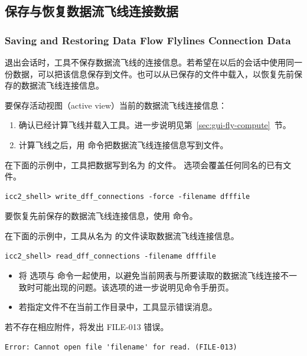 \subsection{保存与恢复数据流飞线连接数据}
\subsubsection*{Saving and Restoring Data Flow Flylines Connection Data}

退出会话时，工具不保存数据流飞线的连接信息。若希望在以后的会话中使用同一份数据，可以把该信息保存到文件。也可以从已保存的文件中载入，以恢复先前保存的数据流飞线连接信息。

要保存活动视图（active view）当前的数据流飞线连接信息：
\begin{enumerate}
  \item 确认已经计算飞线并载入工具。进一步说明见第~\ref{sec:gui-fly-compute}~节。
  \item 计算飞线之后，用  命令把数据流飞线连接信息写到文件。
\end{enumerate}

在下面的示例中，工具把数据写到名为  的文件。 选项会覆盖任何同名的已有文件。

\begin{lstlisting}
icc2_shell> write_dff_connections -force -filename dfffile
\end{lstlisting}

要恢复先前保存的数据流飞线连接信息，使用  命令。

在下面的示例中，工具从名为  的文件读取数据流飞线连接信息。

\begin{lstlisting}
icc2_shell> read_dff_connections -filename dfffile
\end{lstlisting}

\begin{itemize}
  \item 将  选项与  命令一起使用，以避免当前网表与所要读取的数据流飞线连接不一致时可能出现的问题。该选项的进一步说明见命令手册页。
  \item 若指定文件不在当前工作目录中，工具显示错误消息。
\end{itemize}

若不存在相应附件，将发出 FILE-013 错误。

\begin{lstlisting}
Error: Cannot open file 'filename' for read. (FILE-013)
\end{lstlisting}


